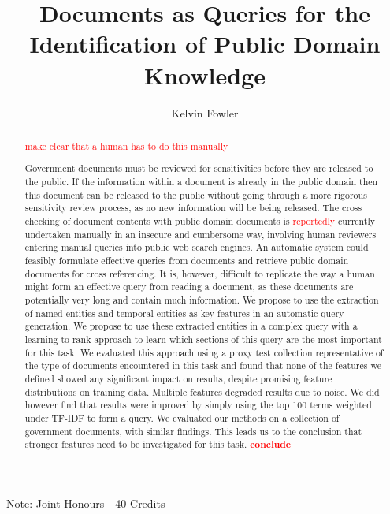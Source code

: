 \documentclass{mpaper}
\newcommand{\remove}[1]{\textcolor{red}{#1}}
\begin{document}
\title{Documents as Queries for the Identification of Public Domain Knowledge}
\author{Kelvin Fowler}

\maketitle
\small{Note: Joint Honours - 40 Credits}
\begin{abstract}

\remove{make clear that a human has to do this manually}

Government documents must be reviewed for sensitivities before they are released to the public. If the information within a document is already in the public domain then this document can be released to the public without going through a more rigorous sensitivity review process, as no new information will be being released.
The cross checking of document contents with public domain documents is \remove{reportedly} currently undertaken manually in an insecure and cumbersome way, involving human reviewers entering manual queries into public web search engines.
An automatic system could feasibly formulate effective queries from documents and retrieve public domain documents for cross referencing. 
It is, however, difficult to replicate the way a human might form an effective query from reading a document, as these documents are potentially very long and contain much information.
We propose to use the extraction of named entities and temporal entities as key features in an automatic query generation.
We propose to use these extracted entities in a complex query with a learning to rank approach to learn which sections of this query are the most important for this task.
We evaluated this approach using a proxy test collection representative of the type of documents encountered in this task and found that none of the features we defined showed any significant impact on results, despite promising feature distributions on training data. Multiple features degraded results due to noise.
We did however find that results were improved by simply using the top 100 terms weighted under TF-IDF to form a query.
We evaluated our methods on a collection of government documents, with similar findings. This leads us to the conclusion that stronger features need to be investigated for this task.
\remove{\textbf{conclude}}

\end{abstract}
\end{document}
